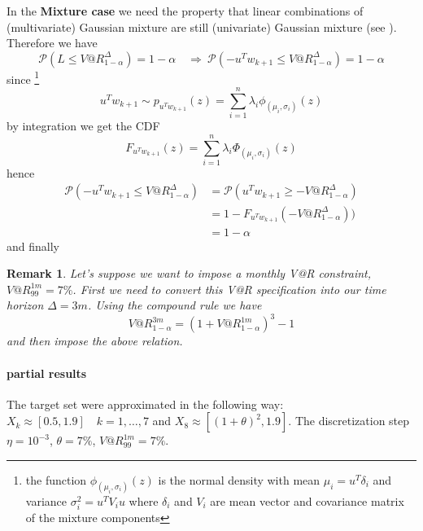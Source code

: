 \documentclass[]{article}
\newtheorem{remark}{Remark}
\begin{document}
In the \textbf{Mixture case} we need the property that linear combinations of (multivariate) Gaussian mixture are still (univariate) Gaussian mixture (see \cite{Mix05}). Therefore we have
\[\mathcal{P}(L \leq V@R_{1-\alpha}^\Delta) = 1-\alpha \quad \Rightarrow\ \mathcal{P}(-u^T w_{k+1} \leq V@R_{1-\alpha}^\Delta) = 1-\alpha     
\] since \footnote{the function $\phi_{(\mu_i,\sigma_i)}(z) $ is the normal density with mean $ \mu_i = u^T \delta_i$ and variance $ \sigma_i^2 = u^T V_i u$ where $\delta_i$ and $V_i$ are mean vector and covariance matrix of the mixture components}
\[u^T w_{k+1} \sim p_{u^T w_{k+1}}(z) = \sum_{i = 1}^{n}\lambda_i \phi_{(\mu_i,\sigma_i)}(z)\] by integration we get the CDF 
\[F_{u^T w_{k+1}}(z) = \sum_{i = 1}^{n}\lambda_i \Phi_{(\mu_i,\sigma_i)}(z)
\]
hence 
\begin{align*}
\mathcal{P}(-u^T w_{k+1} \leq V@R_{1-\alpha}^\Delta) 
&=  \mathcal{P}(u^T w_{k+1} \geq -V@R_{1-\alpha}^\Delta)\\
& = 1 - F_{u^T w_{k+1}}(-V@R_{1-\alpha}^\Delta))  \\
& = 1- \alpha
\end{align*} 
and finally \begin{center}
\end{center}
\begin{remark}
	Let's suppose we want to impose a monthly V@R constraint, $V@R^{1m}_{99} = 7\%$. First we need to convert this V@R specification into our time horizon $\Delta = 3 m$. Using the compound rule we have \[ V@R^{3m}_{1-\alpha} = (1+V@R^{1m}_{1-\alpha})^3-1
	\] and then impose the above relation.
\end{remark}
\paragraph{partial results}
The target set were approximated in the following way:
$X_k \approx [0.5, 1.9] \quad k = 1,\ldots,7$ and $ X_8 \approx [(1+\theta)^2,1.9]$. The discretization step $\eta = 10^{-3}$, $ \theta = 7\%$, $ V@R^{1m}_{99} = 7\%$.
\end{document}
